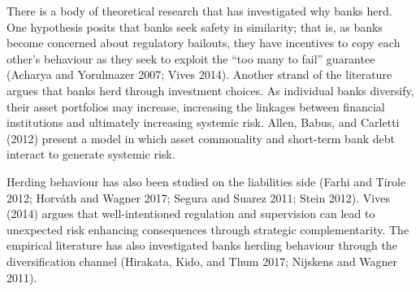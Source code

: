 \documentclass[
  10pt,
]{article}
\begin{document}
There is a body of theoretical research that has investigated why banks
herd. One hypothesis posits that banks seek safety in similarity; that
is, as banks become concerned about regulatory bailouts, they have
incentives to copy each other's behaviour as they seek to exploit the
``too many to fail'' guarantee (Acharya and Yorulmazer 2007; Vives
2014). Another strand of the literature argues that banks herd through
investment choices. As individual banks diversify, their asset
portfolios may increase, increasing the linkages between financial
institutions and ultimately increasing systemic risk. Allen, Babus, and
Carletti (2012) present a model in which asset commonality and
short-term bank debt interact to generate systemic risk.

Herding behaviour has also been studied on the liabilities side (Farhi
and Tirole 2012; Horváth and Wagner 2017; Segura and Suarez 2011; Stein
2012). Vives (2014) argues that well-intentioned regulation and
supervision can lead to unexpected risk enhancing consequences through
strategic complementarity. The empirical literature has also
investigated banks herding behaviour through the diversification channel
(Hirakata, Kido, and Thum 2017; Nijskens and Wagner 2011).
\end{document}
